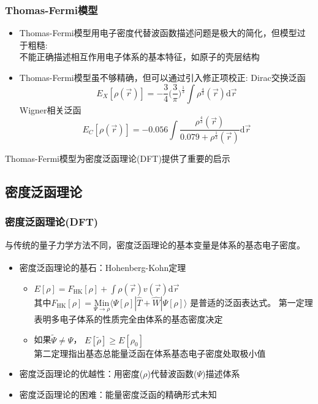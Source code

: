 \documentclass[cjk,slidestop,compress,mathserif,blue]{beamer}
\newcommand{\upcite}[1]{\hspace{0ex}\textsuperscript{\cite{#1}}} %
\begin{document}
\frame
{
	\frametitle{\textrm{Thomas-Fermi}模型}
	\begin{itemize}
		\item \textrm{Thomas-Fermi}模型用电子密度代替波函数描述问题是极大的简化，但模型过于粗糙:\\
			不能正确描述相互作用电子体系的基本特征，如原子的壳层结构
		\item \textrm{Thomas-Fermi}模型虽不够精确，但可以通过引入修正项校正:
			\textrm{Dirac}交换泛函 $$E_X[\rho(\vec r)]=-\dfrac34\bigg(\dfrac3{\pi}\bigg)^{\frac13}\int\rho^{\frac43}(\vec r)\mathrm{d}\vec r$$
			\textrm{Wigner}相关泛函 $$E_C[\rho(\vec r)]=-0.056\int\dfrac{\rho^{\frac43}(\vec r)}{0.079+\rho^{\frac13}(\vec r)}\mathrm{d}\vec r$$
	\end{itemize}
	\textrm{Thomas-Fermi}模型为密度泛函理论\textrm{(DFT)}提供了重要的启示
}

\subsection{密度泛函理论}       %
\frame                               %
{
\frametitle{密度泛函理论(\textrm{DFT})} %
与传统的量子力学方法不同，密度泛函理论的基本变量是体系的基态电子密度。%
\begin{itemize}%
	\item 密度泛函理论的基石：\textrm{Hohenberg-Kohn}定理\upcite{PR136-B864_1964}
\vskip 5pt
\begin{itemize}%
   \setlength{\itemsep}{8pt}
 \item $E[\rho]=F_{\mathrm{HK}}[\rho]+\displaystyle\int\rho(\vec{r})v(\vec{r})\textrm{d}\vec{r}$ \\
\vskip 5pt 其中$F_{\mathrm{HK}}[\rho]=\underset{\Psi\to\rho}{\mathrm{Min}}\langle\Psi[\rho]|\hat{T}+\hat{W}|\Psi[\rho]\rangle$
是普适的泛函表达式。%
     \textrm{\small{第一定理表明多电子体系的性质完全由体系的基态密度决定}}
   \item 如果$\tilde\Psi\neq\Psi$，
     $E[\tilde\rho]\geqslant E[\rho_0]$\\
     \textrm{\small{第二定理指出基态总能量泛函在体系基态电子密度处取极小值}}
   \end{itemize}
\vskip 8pt
 \item 密度泛函理论的优越性：用密度($\rho$)代替波函数($\Psi$)描述体系
\vskip 5pt
 \item 密度泛函理论的困难：能量密度泛函的精确形式未知
   \end{itemize}
}
\end{document}
